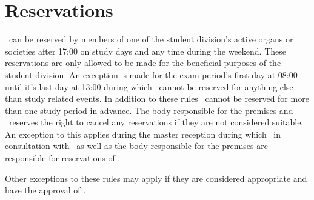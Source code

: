 \documentclass[11pt, includeaddress]{classes/cthit_en}
\begin{document}
\section{Reservations}
\THECLOUD\ can be reserved by members of one of the student division's active organs or societies after 17:00 on study days and any time during the weekend.
These reservations are only allowed to be made for the beneficial purposes of the student division.
An exception is made for the exam period's first day at 08:00 until it's last day at 13:00 during which \THECLOUD\ cannot be reserved for anything else than study related events.
In addition to these rules \THECLOUD\ cannot be reserved for more than one study period in advance.
The body responsible for the premises and \STYRIT\ reserves the right to cancel any reservations if they are not considered suitable.
An exception to this applies during the master reception during which \MRCIT\ in consultation with \STYRIT\ as well as the body responsible for the premises are responsible for reservations of \THECLOUD.

Other exceptions to these rules may apply if they are considered appropriate and have the approval of \STYRIT.

\end{document}
